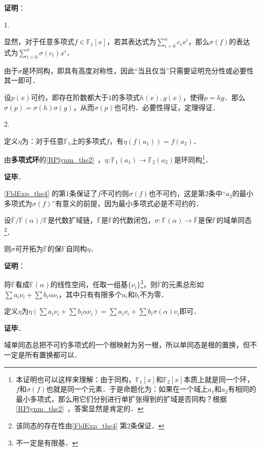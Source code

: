 \textbf{证明}：

1. 

显然，对于任意多项式$f\in\mathbb{F}_1[x]$，若其表达式为$\sum_{i=0}^n c_ix^i$，那么$\sigma(f)$的表达式为$\sum_{i=0}^n \sigma(c_i)x^i$．

由于$\sigma$是环同构，即具有高度对称性，因此“当且仅当”只需要证明充分性或必要性其一即可．

设$p(x)$可约，即存在阶数都大于$1$的多项式$h(x),g(x)$，使得$p=hg$．那么$\sigma(p)=\sigma(h)\sigma(g)$，从而$\sigma(p)$也可约．必要性得证，定理得证．

2. 

定义$\eta$为：对于任意$\mathbb{F}_1$上的多项式$f$，有$\eta(f(a_1))=f(a_2)$．

由\textbf{多项式环}的\autoref{RPlynm_the2}~，$\eta:\mathbb{F}_1(a_1)\to \mathbb{F}_2(a_2)$是环同构\footnote{本证明也可以这样来理解：由于同构，$\mathbb{F}_1[x]$和$\mathbb{F}_2[x]$本质上就是同一个环，$f$和$\sigma(f)$也就是同一个元素．于是命题化为：如果在一个域上$a_1$和$a_2$有相同的最小多项式，那么用它们分别进行单扩张得到的扩域是否同构？根据\autoref{RPlynm_the2}~，答案显然是肯定的．}．



\textbf{证毕}．

\autoref{FldExp_the4} 的第1条保证了$f$不可约则$\sigma(f)$也不可约，这是第2条中“$a_2$的最小多项式为$\sigma(f)$”有意义的前提，因为最小多项式必是不可约的．

\begin{theorem}{}\label{FldExp_the5}
设$\overline{\mathbb{F}}/\mathbb{F}(\alpha)/\mathbb{F}$是代数扩域链，$\overline{\mathbb{F}}$是$\mathbb{F}$的代数闭包，$\sigma:\mathbb{F}(\alpha)\to\overline{\mathbb{F}}$是保$\mathbb{F}$的域单同态\footnote{该同态的存在性由\autoref{FldExp_the4} 第2条保证．}．

则$\sigma$可开拓为$\overline{\mathbb{F}}$的保$\mathbb{F}$自同构$\eta$．
\end{theorem}

\textbf{证明}：


将$\overline{\mathbb{F}}$看成$\mathbb{F}(\alpha)$的线性空间，任取一组基$\{\nu_i\}$\footnote{不一定是有限基．}，则$\overline{\mathbb{F}}$的元素总形如$\sum a_i\nu_i+\sum b_i\alpha\nu_i$，其中只有有限多个$a_i$和$b_i$不为零．

定义$\eta$为$\eta(\sum a_i\nu_i+\sum b_i\alpha\nu_i) = \sum a_i\nu_i+\sum b_i\sigma(\alpha)\nu_i$即可．

\textbf{证毕}．

域单同态总把不可约多项式的一个根映射为另一根，所以单同态是根的置换，但不一定是所有置换都可以．

